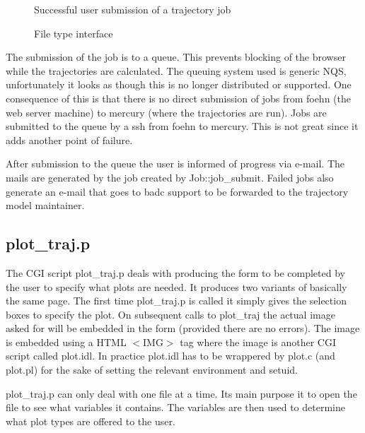 \documentclass[a4paper]{article}
\begin{document}
\begin{figure}
\begin{center}
\epsfxsize=40pc 
\end{center}
\caption{Successful user submission of a trajectory job}
\label{fig:formsubmission}
\end{figure}

\begin{figure}
\begin{center}
\epsfxsize=30pc 
\end{center}
\caption{File type interface}
\label{fig:filetype}
\end{figure}

The submission of the job is to a queue.  This prevents blocking of
the browser while the trajectories are calculated.  The queuing system
used is generic NQS, unfortunately it looks as though this is no
longer distributed or supported.  One consequence of this is that
there is no direct submission of jobs from foehn (the web server
machine) to mercury (where the trajectories are run).  Jobs are
submitted to the queue by a ssh from foehn to mercury.  This is not
great since it adds another point of failure.

After submission to the queue the user is informed of progress via
e-mail.  The mails are generated by the job created by
Job::job\_submit.  Failed jobs also generate an e-mail that goes to
badc support to be forwarded to the trajectory model maintainer.

\subsection{plot\_traj.p}

The CGI script plot\_traj.p deals with producing the form to be
completed by the user to specify what plots are needed.  It produces
two variants of basically the same page.  The first time plot\_traj.p
is called it simply gives the selection boxes to specify the plot.
On subsequent calls to plot\_traj the actual image asked for will be
embedded in the form (provided there are no errors).  The image is
embedded using a HTML $<$IMG$>$ tag where the image is another CGI script
called plot.idl.  In practice plot.idl has to be wrappered by plot.c
(and plot.pl) for the sake of setting the relevant environment and setuid.

plot\_traj.p can only deal with one file at a time.  Its main purpose
it to open the file to see what variables it contains.  The variables
are then used to determine what plot types are offered to the user.
\end{document}
